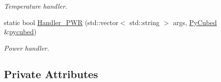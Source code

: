 \begin{DoxyCompactItemize}
\begin{DoxyCompactList}\small\item\em Temperature handler. \end{DoxyCompactList}\item 
static bool \hyperlink{classcubesat_1_1PyCubed_aeeecb0e4d2632827980174128aed304a}{Handler\+\_\+\+P\+WR} (std\+::vector$<$ std\+::string $>$ args, \hyperlink{classcubesat_1_1PyCubed}{Py\+Cubed} \&\hyperlink{pycubed__test_8cpp_ae8c4c37e7742557f28bffebe72eeef5e}{pycubed})
\begin{DoxyCompactList}\small\item\em Power handler. \end{DoxyCompactList}\end{DoxyCompactItemize}
\subsection*{Private Attributes}

